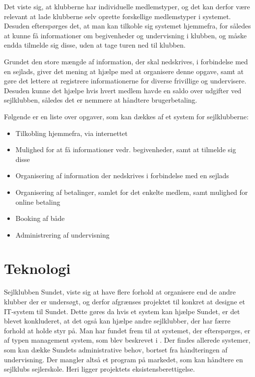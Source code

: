 Det viste sig, at klubberne har individuelle medlemstyper, og det kan derfor være relevant at lade klubberne selv oprette forskellige medlemstyper i systemet. 
Desuden efterspørges det, at man kan tilkoble sig systemet hjemmefra, for således at kunne få informationer om begivenheder og undervisning i klubben, og måske endda tilmelde sig disse, uden at tage turen ned til klubben.

Grundet den store mængde af information, der skal nedskrives, i forbindelse med en sejlads, giver det mening at hjælpe med at organisere denne opgave, samt at gøre det lettere at registrere informationerne for diverse frivillige og undervisere. 
Desuden kunne det hjælpe hvis hvert medlem havde en saldo over udgifter ved sejlklubben, således det er nemmere at håndtere brugerbetaling.

Følgende er en liste over opgaver, som kan dækkes af et system for sejlklubberne:

\begin{itemize}
  \item Tilkobling hjemmefra, via internettet
  \item Mulighed for at få informationer vedr. begivenheder, samt at tilmelde sig disse
  \item Organisering af information der nedskrives i forbindelse med en sejlads
  \item Organisering af betalinger, samlet for det enkelte medlem, samt mulighed for online betaling
  \item Booking af både
  \item Administrering af undervisning
\end{itemize}


\section{Teknologi}

Sejlklubben Sundet, viste sig at have flere forhold at organisere end de andre klubber der er undersøgt, og derfor afgrænses projektet til konkret at designe et IT-system til Sundet. 
Dette gøres da hvis et system kan hjælpe Sundet, er det blevet konkluderet, at det også kan hjælpe andre sejlklubber, der har færre forhold at holde styr på.
Man har fundet frem til at systemet, der efterspørges, er af typen management system, som blev beskrevet i .
Der findes allerede systemer, som kan dække Sundets administrative behov, bortset fra håndteringen af undervisning.
Der mangler altså et program på markedet, som kan håndtere en sejlklubs sejlerskole.
Heri ligger projektets eksistensberettigelse.


